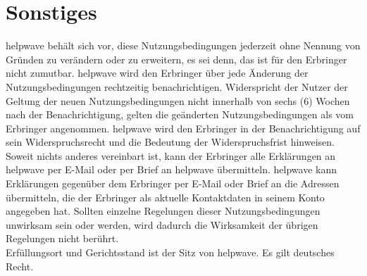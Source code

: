 \documentclass[10pt]{article}
\begin{document}
\section{Sonstiges}
helpwave behält sich vor, diese Nutzungsbedingungen jederzeit ohne Nennung von Gründen zu verändern oder zu erweitern,
es sei denn, das ist für den Erbringer nicht zumutbar. helpwave wird den Erbringer über jede Änderung der Nutzungsbedingungen rechtzeitig benachrichtigen. Widerspricht der Nutzer der Geltung der neuen Nutzungsbedingungen nicht innerhalb
von sechs (6) Wochen nach der Benachrichtigung, gelten die geänderten Nutzungsbedingungen als vom Erbringer angenommen. helpwave wird den Erbringer in der Benachrichtigung auf sein Widerspruchsrecht und die Bedeutung der Widerspruchsfrist hinweisen.
Soweit nichts anderes vereinbart ist, kann der Erbringer alle Erklärungen an helpwave per E-Mail oder per Brief an helpwave
übermitteln. helpwave kann Erklärungen gegenüber dem Erbringer per E-Mail oder Brief an die Adressen übermitteln, die der
Erbringer als aktuelle Kontaktdaten in seinem Konto angegeben hat.
Sollten einzelne Regelungen dieser Nutzungsbedingungen unwirksam sein oder werden, wird dadurch die Wirksamkeit der
übrigen Regelungen nicht berührt. \\
Erfüllungsort und Gerichtsstand ist der Sitz von helpwave.
Es gilt deutsches Recht.
\end{document}
